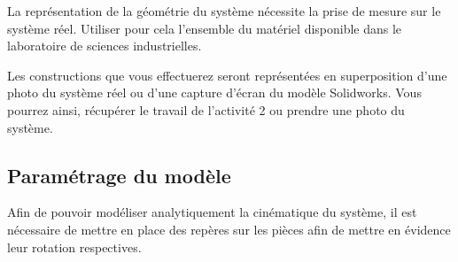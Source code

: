 La représentation de la géométrie du système nécessite la prise de mesure sur le système réel. Utiliser pour cela l'ensemble du matériel disponible dans le laboratoire de sciences industrielles.

Les constructions que vous effectuerez seront représentées en superposition d'une photo du système réel ou d'une capture d'écran du modèle Solidworks. Vous pourrez ainsi, récupérer le travail de l'activité 2 ou prendre une photo du système.


\subsection{Paramétrage du modèle}

Afin de pouvoir modéliser analytiquement la cinématique du système, il est nécessaire de mettre en place des repères sur les pièces afin de mettre en évidence leur rotation respectives.




